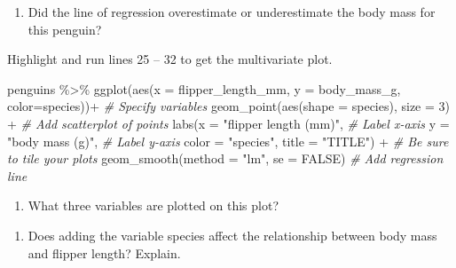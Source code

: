 \documentclass[
]{report}
\newenvironment{Shaded}{\begin{snugshade}}{\end{snugshade}}
\newcommand{\AttributeTok}[1]{\textcolor[rgb]{0.77,0.63,0.00}{#1}}
\newcommand{\CommentTok}[1]{\textcolor[rgb]{0.56,0.35,0.01}{\textit{#1}}}
\newcommand{\ConstantTok}[1]{\textcolor[rgb]{0.00,0.00,0.00}{#1}}
\newcommand{\DecValTok}[1]{\textcolor[rgb]{0.00,0.00,0.81}{#1}}
\newcommand{\FunctionTok}[1]{\textcolor[rgb]{0.00,0.00,0.00}{#1}}
\newcommand{\NormalTok}[1]{#1}
\newcommand{\SpecialCharTok}[1]{\textcolor[rgb]{0.00,0.00,0.00}{#1}}
\newcommand{\StringTok}[1]{\textcolor[rgb]{0.31,0.60,0.02}{#1}}
\providecommand{\tightlist}{%
  \setlength{\itemsep}{0pt}\setlength{\parskip}{0pt}}
\begin{document}
\vspace{.8in}

\begin{enumerate}
\def\labelenumi{\arabic{enumi}.}
\setcounter{enumi}{8}
\tightlist
\item
  Did the line of regression overestimate or underestimate the body mass for this penguin?
\end{enumerate}

\vspace{0.5in}

Highlight and run lines 25 -- 32 to get the multivariate plot.

\begin{Shaded}
\begin{Highlighting}[]
\NormalTok{penguins }\SpecialCharTok{\%\textgreater{}\%}
  \FunctionTok{ggplot}\NormalTok{(}\FunctionTok{aes}\NormalTok{(}\AttributeTok{x =}\NormalTok{ flipper\_length\_mm, }\AttributeTok{y =}\NormalTok{ body\_mass\_g, }\AttributeTok{color=}\NormalTok{species))}\SpecialCharTok{+}  \CommentTok{\# Specify variables}
  \FunctionTok{geom\_point}\NormalTok{(}\FunctionTok{aes}\NormalTok{(}\AttributeTok{shape =}\NormalTok{ species), }\AttributeTok{size =} \DecValTok{3}\NormalTok{) }\SpecialCharTok{+}  \CommentTok{\# Add scatterplot of points}
  \FunctionTok{labs}\NormalTok{(}\AttributeTok{x =} \StringTok{"flipper length (mm)"}\NormalTok{,  }\CommentTok{\# Label x{-}axis}
       \AttributeTok{y =} \StringTok{"body mass (g)"}\NormalTok{,  }\CommentTok{\# Label y{-}axis}
       \AttributeTok{color =} \StringTok{"species"}\NormalTok{,}
       \AttributeTok{title =} \StringTok{"TITLE"}\NormalTok{) }\SpecialCharTok{+} \CommentTok{\# Be sure to tile your plots}
  \FunctionTok{geom\_smooth}\NormalTok{(}\AttributeTok{method =} \StringTok{"lm"}\NormalTok{, }\AttributeTok{se =} \ConstantTok{FALSE}\NormalTok{)  }\CommentTok{\# Add regression line}
\end{Highlighting}
\end{Shaded}

\begin{enumerate}
\def\labelenumi{\arabic{enumi}.}
\setcounter{enumi}{9}
\tightlist
\item
  What three variables are plotted on this plot?
\end{enumerate}

\vspace{0.3in}

\begin{enumerate}
\def\labelenumi{\arabic{enumi}.}
\setcounter{enumi}{10}
\tightlist
\item
  Does adding the variable species affect the relationship between body mass and flipper length? Explain.
\end{enumerate}
\end{document}
